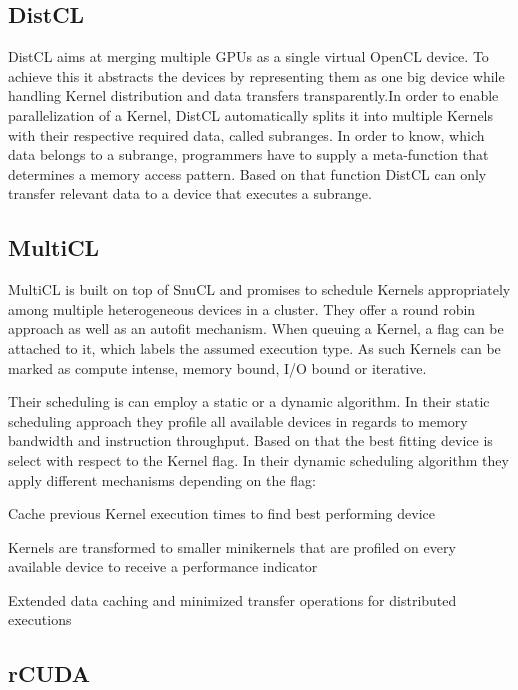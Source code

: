 \subsection*{DistCL}
DistCL aims at merging multiple GPUs as a single virtual OpenCL device\cite{distcl}. To achieve this it abstracts the devices by representing them as one big device while handling Kernel distribution and data transfers transparently.In order to enable parallelization of a Kernel, DistCL automatically splits it into multiple Kernels with their respective required data, called subranges. In order to know, which data belongs to a subrange, programmers have to supply a meta-function that determines a memory access pattern. Based on that function DistCL can only transfer relevant data to a device that executes a subrange.

\subsection*{MultiCL}

MultiCL is built on top of SnuCL and promises to schedule Kernels appropriately among multiple heterogeneous devices in a cluster\cite{multicl}. They offer a round robin approach as well as an autofit mechanism. When queuing a Kernel, a flag can be attached to it, which labels the assumed execution type. As such Kernels can be marked as compute intense, memory bound, I/O bound or iterative.

Their scheduling is can employ a static or a dynamic algorithm. In their static scheduling approach they profile all available devices in regards to memory bandwidth and instruction throughput. Based on that the best fitting device is select with respect to the Kernel flag. In their dynamic scheduling algorithm they apply different mechanisms depending on the flag:

\begin{description}[align=left,leftmargin=0cm]
\item [Iterative] Cache previous Kernel execution times to find best performing device
\item [Compute-intensive] Kernels are transformed to smaller minikernels that are profiled on every available device to receive a performance indicator
\item [I/O-intensive] Extended data caching and minimized transfer operations for distributed executions
\end{description}

\subsection*{rCUDA}

